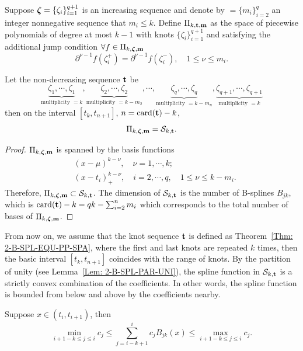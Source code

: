     \begin{definition}
        Suppose $\boldsymbol \zeta = \{\zeta_i\}_{i=1}^{q+1}$ is an increasing sequence and denote by $\bm = \{m_i\}_{i=2}^q$ an integer nonnegative sequence that $m_i \le k$. Define $\Pi_{k, \mathbf t, \mathbf m}$ as the space of piecewise polynomials of degree at most $k-1$ with knots $\{\zeta_i\}_{i=1}^{q+1}$ and satisfying the additional jump condition $\forall f\in \Pi_{k, \boldsymbol \zeta, \mathbf m}$ 
        \begin{equation}
            \partial^{\nu-1} f(\zeta_i^{+}) = \partial^{\nu-1} f(\zeta_i^{-}),\quad 1 \le \nu \le m_i.
        \end{equation}
    \end{definition}
    \begin{theorem}
        \label{Thm: 2-B-SPL-EQU-PP-SPA}
        Let the non-decreasing sequence $\mathbf t$ be 
        \begin{equation}
            \underbrace{\zeta_1, \cdots, \zeta_1}_{\text{multiplicity } = k}, \underbrace{\zeta_2, \cdots, \zeta_2}_{\text{multiplicity } = k - m_2},\cdots, \underbrace{\zeta_{q}, \cdots, \zeta_q}_{\text{multiplicity } = k - m_n}, \underbrace{\zeta_{q+1}, \cdots, \zeta_{q+1}}_{\text{multiplicity } = k} 
        \end{equation}
        then on the interval $[t_{k}, t_{n+1}]$, $n = \text{card}(\mathbf t) - k$, 
        $$\Pi_{k, \boldsymbol \zeta, \mathbf m} = \mathcal S_{k, \mathbf t}.$$
    \end{theorem}
    \begin{proof}
        $\Pi_{k,\boldsymbol \zeta, \mathbf m}$ is spanned by the basis functions 
        \begin{equation*}
            \begin{aligned}
                &(x - \mu)^{k-\nu}, \quad \nu = 1,\cdots, k; \\
                &(x - t_i)^{k - \nu}_{+},\quad i=2,\cdots, q,\quad 1\le \nu \le k - m_i.
            \end{aligned}
        \end{equation*}
       Therefore, $\Pi_{k,\boldsymbol \zeta, \mathbf m}\subset \mathcal S_{k, \mathbf t}$. The dimension of $\mathcal S_{k, \mathbf t}$ is the number of B-splines $B_{jk}$, which is $\text{card}(\mathbf t) - k = q k - \sum_{i=2}^n m_i$ which corresponds to the total number of bases of $\Pi_{k,\boldsymbol \zeta, \mathbf m}$. 
    \end{proof}
From now on, we assume that the knot sequence $\mathbf t$ is defined as Theorem~\ref{Thm: 2-B-SPL-EQU-PP-SPA}, where the first and last knots are repeated $k$ times, then the basic interval $[t_k, t_{n+1}]$ coincides with the range of knots. By the partition of unity (see Lemma~\ref{Lem: 2-B-SPL-PAR-UNI}), the spline function in $\mathcal S_{k,\mathbf t}$ is a strictly convex combination of the coefficients. In other words, the spline function is bounded from below and above by the coefficients nearby.
\begin{theorem}
    \label{Thm: 2-B-SPL-CON-NUM}
    Suppose $x \in (t_i, t_{i+1})$, then 
    $$ \min_{i+1-k\le j \le i} c_j \le  \sum_{j=i-k+1}^i c_j B_{jk}(x)  \le \max_{i+1-k\le j\le i} {c_j}.$$
\end{theorem}

